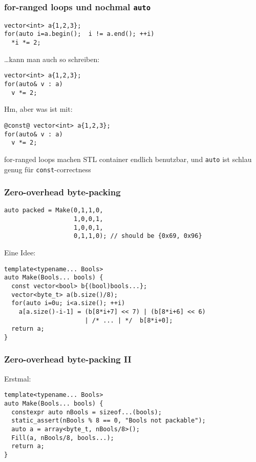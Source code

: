 \documentclass[t,ngerman]{beamer}
\begin{document}
\begin{frame}[fragile]
  \frametitle{for-ranged loops und nochmal \lstinline!auto!}
\begin{lstlisting}
vector<int> a{1,2,3};
for(auto i=a.begin();  i != a.end(); ++i)
  *i *= 2;
\end{lstlisting}

\pause
\ldots{}kann man auch so schreiben:
\begin{lstlisting}
vector<int> a{1,2,3};
for(auto& v : a)
  v *= 2;
\end{lstlisting}

\pause
Hm, aber was ist mit:
\begin{lstlisting}
@const@ vector<int> a{1,2,3};
for(auto& v : a)
  v *= 2;
\end{lstlisting}

\pause
\begin{block}{}
  \centering
  for-ranged loops machen STL container endlich benutzbar,
  und \lstinline!auto! ist schlau genug für \lstinline!const!-correctness
\end{block}
  
\end{frame}

\begin{frame}[fragile]
  \frametitle{Zero-overhead byte-packing}
  \begin{lstlisting}
auto packed = Make(0,1,1,0,
                   1,0,0,1,	
                   1,0,0,1,
                   0,1,1,0); // should be {0x69, 0x96}
  \end{lstlisting}

\pause
Eine Idee:
\begin{lstlisting}
template<typename... Bools>
auto Make(Bools... bools) {
  const vector<bool> b{(bool)bools...};
  vector<byte_t> a(b.size()/8);
  for(auto i=0u; i<a.size(); ++i)
    a[a.size()-i-1] = (b[8*i+7] << 7) | (b[8*i+6] << 6) 
                      | /* ... | */  b[8*i+0];
  return a;
}
\end{lstlisting}
  
\end{frame}

\begin{frame}[fragile]
  \frametitle{Zero-overhead byte-packing II}
  
Erstmal: 
\begin{lstlisting}
template<typename... Bools>
auto Make(Bools... bools) {
  constexpr auto nBools = sizeof...(bools);
  static_assert(nBools % 8 == 0, "Bools not packable");
  auto a = array<byte_t, nBools/8>();
  Fill(a, nBools/8, bools...);
  return a;
}
\end{lstlisting}

\end{frame}
\end{document}

